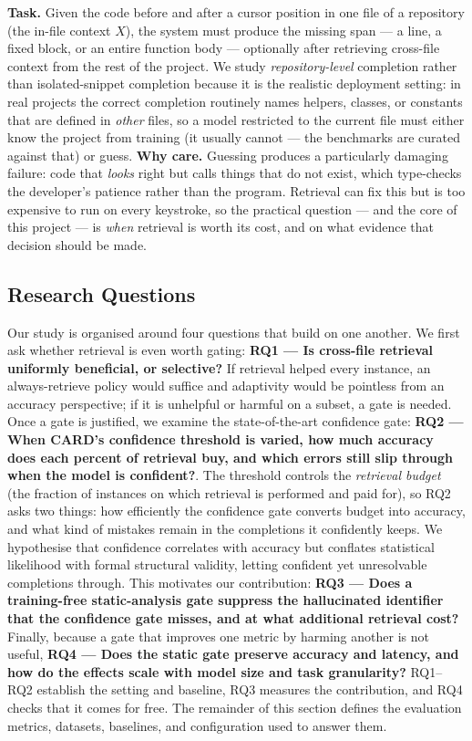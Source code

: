 \documentclass[10pt,conference]{IEEEtran}
\newcommand{\rev}[1]{{\color{red}#1}}
\newcommand{\ugr}[1]{{\color{revgreen}#1}}
\begin{document}
\ugr{\textbf{Task.} Given the code before and after a cursor position in one file
of a repository (the in-file context $X$), the system must produce the missing
span --- a line, a fixed block, or an entire function body --- optionally after
retrieving cross-file context from the rest of the project. We study
\emph{repository-level} completion rather than isolated-snippet completion
because it is the realistic deployment setting: in real projects the correct
completion routinely names helpers, classes, or constants that are defined in
\emph{other} files, so a model restricted to the current file must either know
the project from training (it usually cannot --- the benchmarks are curated
against that) or guess. \textbf{Why care.} Guessing produces a particularly
damaging failure: code that \emph{looks} right but calls things that do not
exist, which type-checks the developer's patience rather than the program.
Retrieval can fix this but is too expensive to run on every keystroke, so the
practical question --- and the core of this project --- is \emph{when} retrieval
is worth its cost, and on what evidence that decision should be made.}

\subsection{Research Questions}

\rev{Our study is organised around four questions that build on one another. We
first ask whether retrieval is even worth gating: \textbf{RQ1 --- Is cross-file
retrieval uniformly beneficial, or selective?} \ugr{If retrieval helped every
instance, an always-retrieve policy would suffice and adaptivity would be
pointless from an accuracy perspective; if it is unhelpful or harmful on a
subset, a gate is needed. Once a gate is justified}, we examine the
state-of-the-art confidence gate: \ugr{\textbf{RQ2 --- When CARD's confidence
threshold is varied, how much accuracy does each percent of retrieval buy, and
which errors still slip through when the model is confident?}. The threshold
controls the \emph{retrieval budget} (the fraction of instances on which
retrieval is performed and paid for), so RQ2 asks two things: how efficiently
the confidence gate converts budget into accuracy, and what kind of mistakes
remain in the completions it confidently keeps.} We hypothesise that confidence
correlates with accuracy but conflates statistical likelihood with formal structural validity, letting confident
yet unresolvable completions through. This motivates our contribution:
\textbf{RQ3 --- Does a training-free static-analysis gate suppress the
hallucinated identifier that the confidence gate misses, and at what
additional retrieval cost?} Finally, because a gate that improves one metric by
harming another is not useful, \textbf{RQ4 --- Does the static gate preserve
accuracy and latency, and how do the effects scale with model size and task
granularity?} RQ1--RQ2 establish the setting and baseline, RQ3 measures the
contribution, and RQ4 checks that it comes for free. The remainder of this section
defines the evaluation metrics, datasets, baselines, and configuration used to
answer them.}
\end{document}
